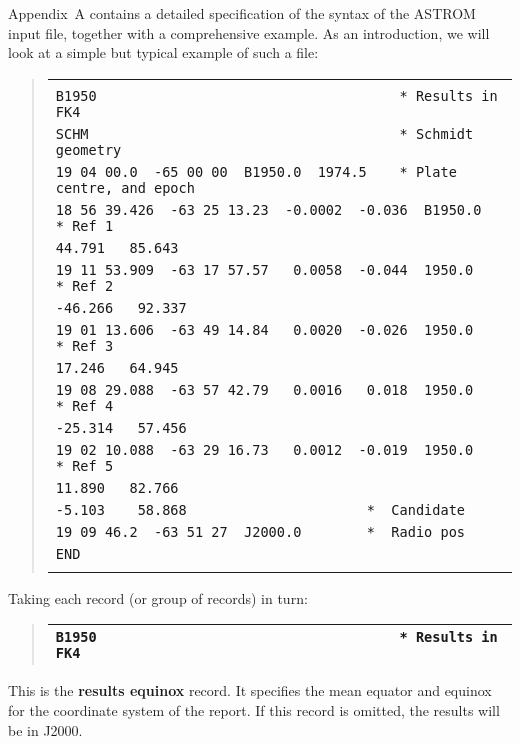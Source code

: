 Appendix~A contains a detailed specification of the syntax of
the ASTROM input file, together with a comprehensive example.
As an introduction, we will look at a simple but typical example
of such a file:

\begin{quote}
\begin{small}
\begin{tabular}{|l|}
\hline
\\
\verb|B1950                                     * Results in FK4| \\
\verb|SCHM                                      * Schmidt geometry| \\
\verb|19 04 00.0  -65 00 00  B1950.0  1974.5    * Plate centre, and epoch| \\
\verb|18 56 39.426  -63 25 13.23  -0.0002  -0.036  B1950.0  * Ref 1| \\
\verb|44.791   85.643| \\
\verb|19 11 53.909  -63 17 57.57   0.0058  -0.044  1950.0   * Ref 2| \\
\verb|-46.266   92.337| \\
\verb|19 01 13.606  -63 49 14.84   0.0020  -0.026  1950.0   * Ref 3| \\
\verb|17.246   64.945| \\
\verb|19 08 29.088  -63 57 42.79   0.0016   0.018  1950.0   * Ref 4| \\
\verb|-25.314   57.456| \\
\verb|19 02 10.088  -63 29 16.73   0.0012  -0.019  1950.0   * Ref 5| \\
\verb|11.890   82.766| \\
\verb|-5.103    58.868                      *  Candidate| \\
\verb|19 09 46.2  -63 51 27  J2000.0        *  Radio pos| \\
\verb|END| \\
\\
\hline
\end{tabular}
\end{small}
\end{quote}

\goodbreak
Taking each record (or group of records) in turn:

\begin{quote}
\begin{tabular}{|l|}
\hline
\verb|B1950                                     * Results in FK4| \\
\hline
\end{tabular}
\end{quote}
This is the {\bf results equinox} record.
It specifies the mean equator and equinox for the coordinate
system of the report.
If this record is omitted, the results will be in J2000.

